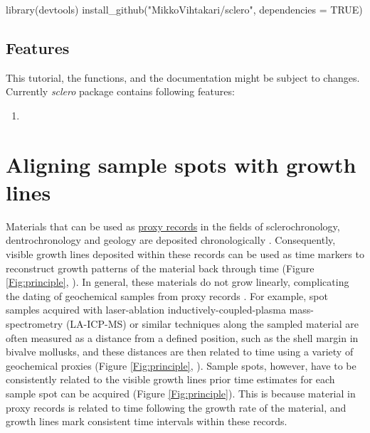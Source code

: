 \documentclass[11pt, a4paper]{article}
\newcommand{\sclero}{\textit{sclero}\xspace}
\begin{document}
\begin{Schunk}
\begin{Sinput}
 library(devtools)
 install_github("MikkoVihtakari/sclero", dependencies = TRUE)
\end{Sinput}
\end{Schunk}

\subsection{Features}

This tutorial, the functions, and the documentation might be subject to changes. Currently \sclero package contains following features: 

\begin{enumerate}
\item {}
\end{enumerate}

\clearpage
\section{Aligning sample spots with growth lines} \label{sec:align}

Materials that can be used as \href{http://en.wikipedia.org/wiki/Proxy_(climate)}{proxy records} in the fields of sclerochronology, dentrochronology and geology are deposited chronologically \citep{Masson-Delmotte2013}. Consequently, visible growth lines deposited within these records can be used as time markers to reconstruct growth patterns of the material back through time (Figure \ref{Fig:principle}, \citealp{Proctor2000,Sejr2002,Schone2005a,Ambrose2012}). In general, these materials do not grow linearly, complicating the dating of geochemical samples from proxy records \citep{Schone2008,Ambrose2012}. For example, spot samples acquired with laser-ablation inductively-coupled-plasma mass-spectrometry (LA-ICP-MS) or similar techniques along the sampled material are often measured as a distance from a defined position, such as the shell margin in bivalve mollusks, and these distances are then related to time using a variety of geochemical proxies (Figure \ref{Fig:principle}, \citealp{Vihtakari2014}). Sample spots, however, have to be consistently related to the visible growth lines prior time estimates for each sample spot can be acquired (Figure \ref{Fig:principle}). This is because material in proxy records is related to time following the growth rate of the material, and growth lines mark consistent time intervals within these records. 
\end{document}
